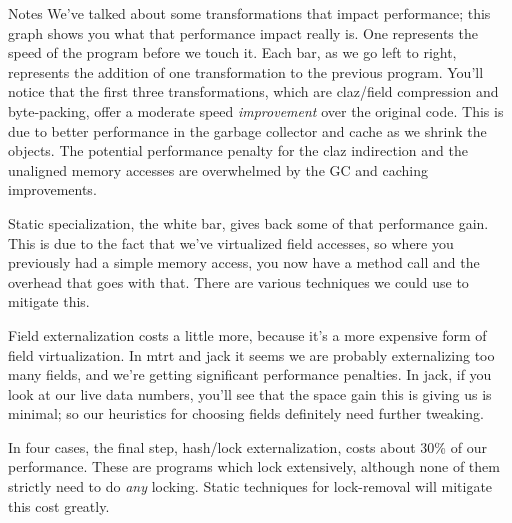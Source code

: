 \documentclass[%
pdf,
colorBG,
slideColor,
nototal,
oqe
]{prosper}
\newenvironment{talknotes}{\begin{slide}{Notes}\tiny}{\end{slide}}
\begin{document}
\begin{talknotes}
We've talked about some transformations that impact performance;
this graph shows you what that performance impact really is.
One represents the speed of the program before we touch it.
Each bar, as we go left to right, represents the addition of one
transformation to the previous program.
You'll notice that the first three transformations, which are
claz/field compression and byte-packing, offer a moderate speed
\emph{improvement} over the original code.  This is due to
better performance in the garbage collector and cache as we shrink the
objects.  The potential performance penalty for the claz indirection
and the unaligned memory accesses are overwhelmed by the GC and caching
improvements.

Static specialization, the white bar, gives back some of that
performance gain.  This is due to the fact that we've virtualized
field accesses, so where you previously had a simple memory access,
you now have a method call and the overhead that goes with that.
There are various techniques we could use to mitigate this.

Field externalization costs a little more, because it's a more
expensive form of field virtualization.  In mtrt and jack it seems we
are probably externalizing too many fields, and we're getting
significant performance penalties.  In jack, if you look at our live
data numbers, you'll see that the space gain this is giving us is
minimal; so our heuristics for choosing fields definitely need further
tweaking.

In four cases, the final step, hash/lock externalization, costs about
30\% of our performance.  These are programs which lock extensively,
although none of them strictly need to do \emph{any} locking.
Static techniques for lock-removal will mitigate this cost greatly.

~%
\end{talknotes}
\end{document}
